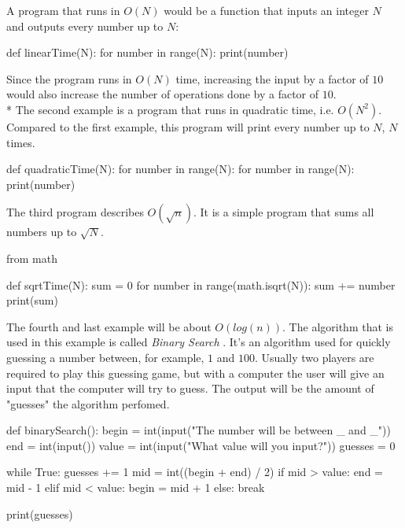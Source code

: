 \documentclass[main.tex]{subfiles}
\begin{document}
\vspace{10mm}

A program that runs in $O(N)$ would be a function that inputs an integer $N$ and outputs every number up to $N$:
\begin{python}
def linearTime(N):
    for number in range(N):
        print(number)
\end{python}

Since the program runs in $O(N)$ time, increasing the input by a factor of $10$ would also increase the number of operations done by a factor of $10$.
\newline
\\*
The second example is a program that runs in quadratic time, i.e. $O(N^{2})$. Compared to the first example, this program will print every number up to $N$, $N$ times.

\begin{python}
    def quadraticTime(N):
        for number in range(N):
            for number in range(N):
                print(number)
\end{python}

\vspace{10mm}

The third program describes $O(\sqrt{n})$. It is a simple program that sums all numbers up to $\sqrt{N}$.

\begin{python}
    from math

    def sqrtTime(N):
        sum = 0
        for number in range(math.isqrt(N)):
            sum += number
        print(sum)
\end{python}

\vspace{10mm}

The fourth and last example will be about $O(log (n))$. The algorithm that is used in this example is called \textit{Binary Search} \cite{algh:binary_search}. It's an algorithm used for quickly guessing a number between, for example, $1$ and $100$. Usually two players are required to play this guessing game, but with a computer the user will give an input that the computer will try to guess. The output will be the amount of "guesses" the algorithm perfomed.

\begin{python}
    def binarySearch():
        begin = int(input("The number will be between _ and _\n"))
        end = int(input())
        value = int(input("What value will you input?\n"))
        guesses = 0

        while True:
            guesses += 1
            mid = int((begin + end) / 2)
            if mid > value:
                end = mid - 1
            elif mid < value:
                begin = mid + 1
            else:
                break

    print(guesses)

\end{python}
\end{document}
